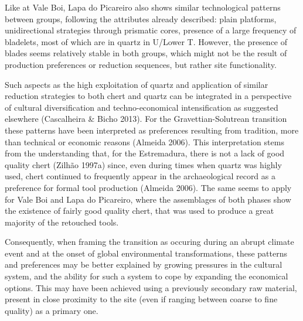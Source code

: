\documentclass[12pt,twoside]{reedthesis}
\begin{document}
Like at Vale Boi, Lapa do Picareiro also shows similar technological patterns between groups, following the attributes already described: plain platforms, unidirectional strategies through prismatic cores, presence of a large frequency of bladelets, most of which are in quartz in U/Lower T. However, the presence of blades seems relatively stable in both groups, which might not be the result of production preferences or reduction sequences, but rather site functionality.

Such aspects as the high exploitation of quartz and application of similar reduction strategies to both chert and quartz can be integrated in a perspective of cultural diversification and techno-economical intensification as suggested elsewhere (Cascalheira \& Bicho 2013). For the Gravettian-Solutrean transition these patterns have been interpreted as preferences resulting from tradition, more than technical or economic reasons (Almeida 2006). This interpretation stems from the understanding that, for the Estremadura, there is not a lack of good quality chert (Zilhão 1997a) since, even during times when quartz was highly used, chert continued to frequently appear in the archaeological record as a preference for formal tool production (Almeida 2006). The same seems to apply for Vale Boi and Lapa do Picareiro, where the assemblages of both phases show the existence of fairly good quality chert, that was used to produce a great majority of the retouched tools.

Consequently, when framing the transition as occuring during an abrupt climate event and at the onset of global environmental transformations, these patterns and preferences may be better explained by growing pressures in the cultural system, and the ability for such a system to cope by expanding the economical options. This may have been achieved using a previously secondary raw material, present in close proximity to the site (even if ranging between coarse to fine quality) as a primary one.
\end{document}
